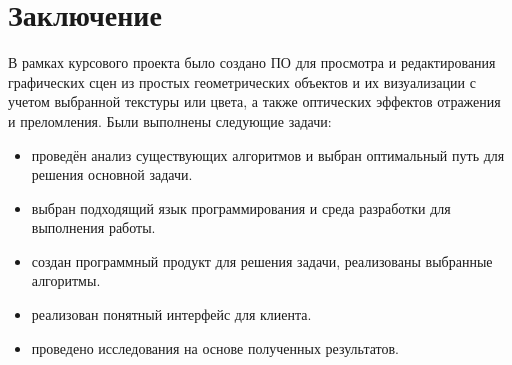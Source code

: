 \chapter*{Заключение}
В рамках курсового проекта было создано ПО для просмотра и редактирования графических сцен из простых геометрических объектов и их визуализации с
учетом выбранной текстуры или цвета, а также оптических эффектов отражения и преломления.
Были выполнены следующие задачи:
\begin{itemize}
\item проведён анализ существующих алгоритмов и выбран оптимальный путь для решения основной задачи.
\item выбран подходящий язык программирования и среда разработки для выполнения работы.
\item создан программный продукт для решения задачи, реализованы выбранные алгоритмы.
\item реализован понятный интерфейс для клиента.
\item проведено исследования на основе полученных результатов.
\end{itemize}